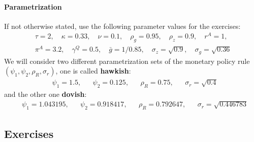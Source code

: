 \documentclass{article}
\begin{document}
\paragraph{Parametrization}
If not otherwise stated, use the following parameter values for the exercises:
\begin{align*}
&\tau=2,\quad
\kappa=0.33,\quad
\nu=0.1,\quad
\rho_g=0.95,\quad
\rho_z=0.9,\quad	
r^{A}=1,\quad
\\
&\pi^{A}=3.2,\quad
\gamma^{Q}=0.5,\quad
\bar{g}=1/0.85,\quad
\sigma_z = \sqrt{0.9},\quad
\sigma_g=\sqrt{0.36}
\end{align*}
We will consider two different parametrization sets of the monetary policy rule \((\psi_1,\psi_2,\rho_R,\sigma_r)\), one is called \textbf{hawkish}:
\begin{align*}
&\psi_1=1.5,&& \psi_2=0.125,&& \rho_R = 0.75,&& \sigma_r = \sqrt{0.4}
\end{align*}
and the other one \textbf{dovish}:
\begin{align*}
&\psi_1=1.043195,&& \psi_2=0.918417,&& \rho_R = 0.792647,&& \sigma_r = \sqrt{0.446783}	
\end{align*}

\newpage

\subsection*{Exercises}
\end{document}

